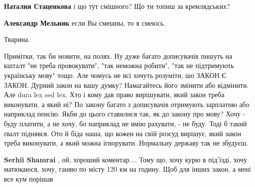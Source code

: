\begin{itemize}
\begin{itemize}
\textbf{Наталия Стаценкова} і що тут смішного? Що ти топиш за кремлядських?

 
\textbf{Александр Мельник} если Вы смешны, то я смеюсь.

\end{itemize}

 
Тварина.

 

Примітки, так би мовити, на полях. Ну дуже багато дописувачів пишуть на кшталт
"не треба провокувати", "так неможна робити", "так не підтримують українську
мову" тощо. Але чомусь не всі хочуть розуміти, шо ЗАКОН Є ЗАКОН. Дурний закон
на вашу думку? Намагайтесь його змінити або відмінити. Але dura lex sed lex.
Хто і кому дав право вирішувати, який закон треба виконувати, а який ні? По
закону багато з дописувачів отримують зарплатню або наприклад пенсію. Якби до
цього ставилися так, як до закону про мову? Хочу - буду платити, а не хочу, бо
наприклад не вмію рахувати, - не буду. Тоді б такий ґвалт піднявся. Ото й біда
наша, що кожен на свій розсуд вирішує, який закон треба виконувати, а який
можна ігнорувати. Нормальну державу так не збудуєш.

\begin{itemize}
 
\textbf{Serhii Shamrai} , ой, хороший коментар.... Тому що, хочу курю в
під'їзді, хочу матюкаюся, хочу, ганяю по місту 120 км на годину. Щоб для інших
закон, а мені все кум порішав


\end{itemize}
\end{itemize}
